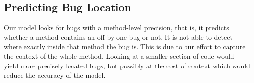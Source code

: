 \subsection{Predicting Bug Location}\label{sec:modelPrecision}
Our model looks for bugs with a method-level precision, that is, it predicts whether a method contains an off-by-one bug or not. It is not able to detect where exactly inside that method the bug is. This is due to our effort to capture the context of the whole method. Looking at a smaller section of code would yield more precisely located bugs, but possibly at the cost of context which would reduce the accuracy of the model.